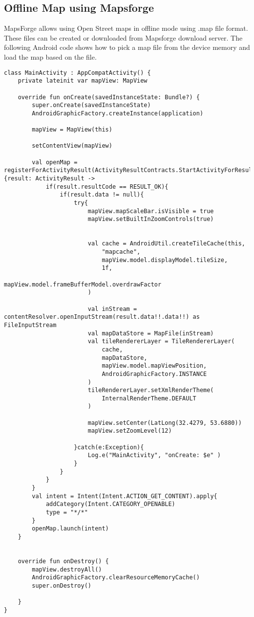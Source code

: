 \documentclass{article}
\begin{document}
\subsection{Offline Map using Mapsforge}
MapsForge allows using Open Street maps in offline mode using .map file format.
These files can be created or downloaded from Mapsforge download server. The following Android code shows how to pick a map file from the device memory and load the map based on the file.
\begin{lstlisting}
class MainActivity : AppCompatActivity() {
    private lateinit var mapView: MapView

    override fun onCreate(savedInstanceState: Bundle?) {
        super.onCreate(savedInstanceState)
        AndroidGraphicFactory.createInstance(application)

        mapView = MapView(this)
        
        setContentView(mapView)

        val openMap = registerForActivityResult(ActivityResultContracts.StartActivityForResult()){result: ActivityResult ->
            if(result.resultCode == RESULT_OK){
                if(result.data != null){
                    try{
                        mapView.mapScaleBar.isVisible = true
                        mapView.setBuiltInZoomControls(true)


                        val cache = AndroidUtil.createTileCache(this,
                            "mapcache",
                            mapView.model.displayModel.tileSize,
                            1f,
                            mapView.model.frameBufferModel.overdrawFactor
                        )

                        val inStream = contentResolver.openInputStream(result.data!!.data!!) as FileInputStream
                        val mapDataStore = MapFile(inStream)
                        val tileRendererLayer = TileRendererLayer(
                            cache,
                            mapDataStore,
                            mapView.model.mapViewPosition,
                            AndroidGraphicFactory.INSTANCE
                        )
                        tileRendererLayer.setXmlRenderTheme(
                            InternalRenderTheme.DEFAULT
                        )

                        mapView.setCenter(LatLong(32.4279, 53.6880))
                        mapView.setZoomLevel(12)

                    }catch(e:Exception){
                        Log.e("MainActivity", "onCreate: $e" )
                    }
                }
            }
        }
        val intent = Intent(Intent.ACTION_GET_CONTENT).apply{
            addCategory(Intent.CATEGORY_OPENABLE)
            type = "*/*"
        }
        openMap.launch(intent)
    }


    override fun onDestroy() {
        mapView.destroyAll()
        AndroidGraphicFactory.clearResourceMemoryCache()
        super.onDestroy()

    }
}

\end{lstlisting}
\end{document}
